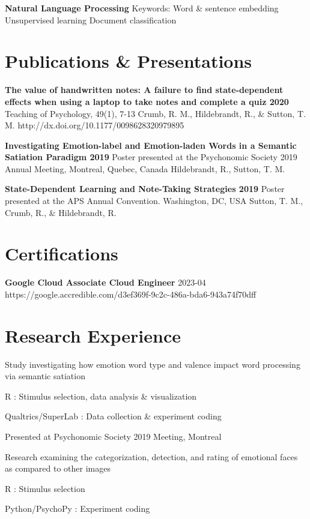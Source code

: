 \documentclass[letterpaper]{deedy-resume_sm}
\begin{document}
\textbf{Natural Language Processing}
Keywords: Word \& sentence embedding \textbullet{} Unsupervised learning \textbullet{} Document classification

\section{Publications \& Presentations}
\textbf{The value of handwritten notes: A failure to find state-dependent effects when using a laptop to take notes and complete a quiz 2020}
Teaching of Psychology, 49(1), 7-13
Crumb, R. M., Hildebrandt, R., \& Sutton, T. M.
http://dx.doi.org/10.1177/0098628320979895

\textbf{Investigating Emotion-label and Emotion-laden Words in a Semantic Satiation Paradigm 2019}
Poster presented at the Psychonomic Society 2019 Annual Meeting, Montreal, Quebec, Canada
Hildebrandt, R., Sutton, T. M.

\textbf{State-Dependent Learning and Note-Taking Strategies 2019}
Poster presented at the APS Annual Convention. Washington, DC, USA
Sutton, T. M., Crumb, R., \& Hildebrandt, R.

\section{Certifications}
\textbf{Google Cloud Associate Cloud Engineer}
2023-04
https://google.accredible.com/d3ef369f-9c2c-486a-bda6-943a74f70dff

\section{Research Experience}
\begin{tightitemize}
\item Study investigating how emotion word type and valence impact word processing via semantic satiation
\item R : Stimulus selection, data analysis \& visualization
\item Qualtrics/SuperLab : Data collection \& experiment coding
\item Presented at Psychonomic Society 2019 Meeting, Montreal
\end{tightitemize}
\sectionspace

\begin{tightitemize}
\item Research examining the categorization, detection, and rating of emotional faces as compared to other images
\item R : Stimulus selection
\item Python/PsychoPy : Experiment coding
\end{tightitemize}
\sectionspace
\end{document}
